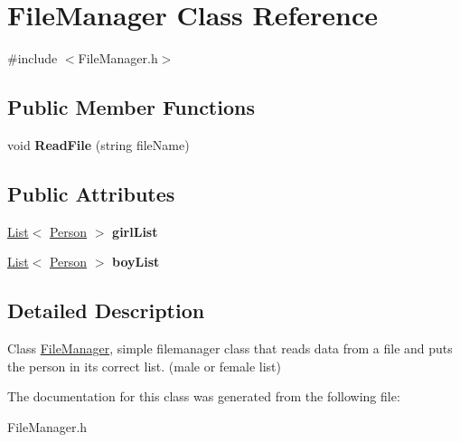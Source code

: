 \hypertarget{class_file_manager}{\section{File\-Manager Class Reference}
\label{class_file_manager}
}


{\ttfamily \#include $<$File\-Manager.\-h$>$}

\subsection*{Public Member Functions}
\begin{DoxyCompactItemize}
\item 
\hypertarget{class_file_manager_a980225cbe346f1d11d25f63bb32b1c0e}{void {\bfseries Read\-File} (string file\-Name)}\label{class_file_manager_a980225cbe346f1d11d25f63bb32b1c0e}

\end{DoxyCompactItemize}
\subsection*{Public Attributes}
\begin{DoxyCompactItemize}
\item 
\hypertarget{class_file_manager_a276f9f89706401049681c2bcb0337d06}{\hyperlink{class_list}{List}$<$ \hyperlink{class_person}{Person} $>$ {\bfseries girl\-List}}\label{class_file_manager_a276f9f89706401049681c2bcb0337d06}

\item 
\hypertarget{class_file_manager_aeebfcb1aafc3d20dec096eafc83dfe9c}{\hyperlink{class_list}{List}$<$ \hyperlink{class_person}{Person} $>$ {\bfseries boy\-List}}\label{class_file_manager_aeebfcb1aafc3d20dec096eafc83dfe9c}

\end{DoxyCompactItemize}


\subsection{Detailed Description}
Class \hyperlink{class_file_manager}{File\-Manager}, simple filemanager class that reads data from a file and puts the person in its correct list. (male or female list) 

The documentation for this class was generated from the following file\-:\begin{DoxyCompactItemize}
\item 
File\-Manager.\-h\end{DoxyCompactItemize}
